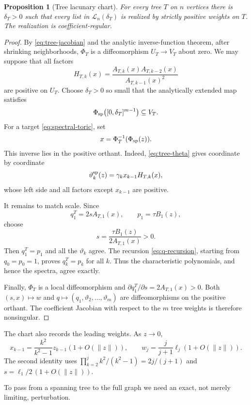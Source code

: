 \documentclass[11pt,reqno]{amsart}
\newtheorem{proposition}[theorem]{Proposition}
\theoremstyle{definition}
\theoremstyle{remark}
\newcommand{\cL}{\mathcal L}
\begin{document}
\begin{proposition}[Tree lacunary chart]\label{prop:tree-chart}
For every tree $T$ on $n$ vertices there is $\delta_T>0$ such that every
list in $\cL_n(\delta_T)$ is realized by strictly positive weights on $T$.
The realization is coefficient-regular.
\end{proposition}

\begin{proof}
By \eqref{eq:tree-jacobian} and the analytic inverse-function theorem,
after shrinking neighborhoods, $\Phi_T$ is a diffeomorphism
$U_T\to V_T$ about zero.  We may suppose that all factors
\[
 H_{T,k}(x)=
 \frac{A_{T,k}(x)A_{T,k-2}(x)}{A_{T,k-1}(x)^2}
\]
are positive on $U_T$.  Choose $\delta_T>0$ so small that the analytically
extended map satisfies
\[
 \Phi_{\rm sp}\big([0,\delta_T]^{m-1}\big)\subseteq V_T.
\]
For a target \eqref{eq:spectral-toric}, set
\[
 x=\Phi_T^{-1}(\Phi_{\rm sp}(z)).
\]
This inverse lies in the positive orthant.  Indeed,
\eqref{eq:tree-theta} gives coordinate by coordinate
\[
 \vartheta_k^{\rm sp}(z)=\gamma_kx_{k-1}H_{T,k}(x),
\]
whose left side and all factors except $x_{k-1}$ are positive.

It remains to match scale.  Since
\[
 q_1^T=2sA_{T,1}(x),\qquad p_1=\tau B_1(z),
\]
choose
\begin{equation}\label{eq:scale-choice}
 s=\frac{\tau B_1(z)}{2A_{T,1}(x)}>0.
\end{equation}
Then $q_1^T=p_1$ and all the $\vartheta_k$ agree.  The recursion
\eqref{eq:q-recursion}, starting from $q_0=p_0=1$, proves
$q_k^T=p_k$ for all $k$.  Thus the characteristic polynomials, and hence
the spectra, agree exactly.

Finally, $\Phi_T$ is a local diffeomorphism and
$\partial q_1^T/\partial s=2A_{T,1}(x)>0$.  Both
$(s,x)\mapsto w$ and
$q\mapsto(q_1,\vartheta_2,\ldots,\vartheta_m)$ are diffeomorphisms on the
positive orthant.  The coefficient Jacobian with respect to the $m$ tree
weights is therefore nonsingular.
\end{proof}

The chart also records the leading weights.  As $z\to0$,
\begin{equation}\label{eq:weight-asymptotic}
 x_{k-1}=\frac{k^2}{k^2-1}z_{k-1}(1+O(\|z\|)),
 \qquad
 w_j=\frac{j}{j+1}\ell_j(1+O(\|z\|)).
\end{equation}
The second identity uses
$\prod_{k=2}^j k^2/(k^2-1)=2j/(j+1)$ and
$s=\ell_1/2\,(1+O(\|z\|))$.

To pass from a spanning tree to the full graph we need an exact, not merely
limiting, perturbation.
\end{document}
